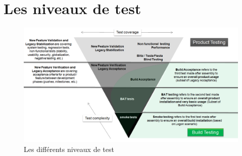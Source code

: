 
\chapter{Les niveaux de test}

\begin{figure}[!h]
  \centering
      \includegraphics[width=0.7\textheight,angle=90]{images/TestingLevels.png}
  \caption{Les diff\'{e}rents niveaux de test}
	\label{figure:testLevels}
\end{figure}

\clearpage
\restoregeometry